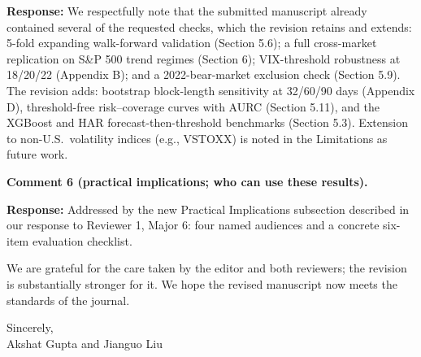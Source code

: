 \documentclass[11pt]{article}
\newcommand{\response}{\textbf{Response:} }
\begin{document}
\response We respectfully note that the submitted manuscript already contained several of the
requested checks, which the revision retains and extends: 5-fold expanding walk-forward
validation (Section 5.6); a full cross-market replication on S\&P 500 trend regimes
(Section 6); VIX-threshold robustness at 18/20/22 (Appendix B); and a 2022-bear-market
exclusion check (Section 5.9). The revision adds: bootstrap block-length sensitivity at
32/60/90 days (Appendix D), threshold-free risk--coverage curves with AURC (Section 5.11),
and the XGBoost and HAR forecast-then-threshold benchmarks (Section 5.3). Extension to
non-U.S.\ volatility indices (e.g., VSTOXX) is noted in the Limitations as future work.

\textbf{Comment 6 (practical implications; who can use these results).}

\response Addressed by the new Practical Implications subsection described in our response to
Reviewer 1, Major 6: four named audiences and a concrete six-item evaluation checklist.

\vspace{1em}
We are grateful for the care taken by the editor and both reviewers; the revision is
substantially stronger for it. We hope the revised manuscript now meets the standards of the
journal.

\begin{flushleft}
Sincerely,\\[4pt]
Akshat Gupta and Jianguo Liu
\end{flushleft}
\end{document}
